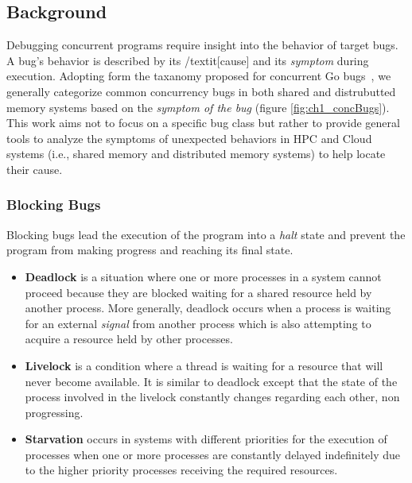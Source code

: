 \subsection{Background}
Debugging concurrent programs require insight into the behavior of target bugs.
%
A bug's behavior is described by its /textit[cause] and its \textit{symptom} during execution.
%
Adopting form the taxanomy proposed for concurrent Go bugs~\cite{tu-concurrentBugs-asplos19}, we generally categorize common concurrency bugs in both shared and distrubutted memory systems based on the \textit{symptom of the bug} (figure \ref{fig:ch1_concBugs}).
%
This work aims not to focus on a specific bug class but rather to provide general tools to analyze the symptoms of unexpected behaviors in HPC and Cloud systems (i.e., shared memory and distributed memory systems) to help locate their cause.

\subsubsection{Blocking Bugs}
Blocking bugs lead the execution of the program into a \textit{halt} state and prevent the program from making progress and reaching its final state.

\begin{itemize}
  \item \textbf{Deadlock} is a situation where one or more processes in a system cannot proceed because they are blocked waiting for a shared resource held by another process. More generally, deadlock occurs when a process is waiting for an external \textit{signal} from another process which is also attempting to acquire a resource held by other processes.
  \item \textbf{Livelock} is a condition where a thread is waiting for a resource that will never become available. It is similar to deadlock except that the state of the process involved in the livelock constantly changes regarding each other, non progressing.
  \item  \textbf{Starvation} occurs in systems with different priorities for the execution of processes when one or more processes are constantly delayed indefinitely due to the higher priority processes receiving the required resources.
\end{itemize}


